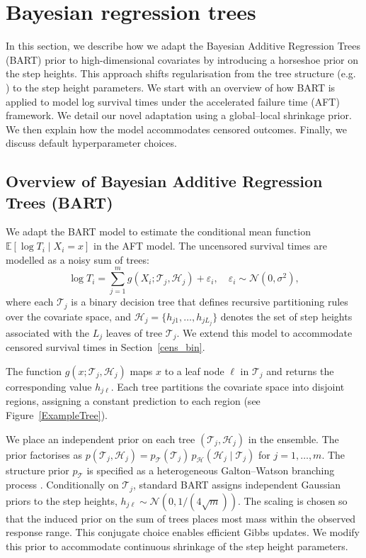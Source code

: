 \section{Bayesian regression trees}\label{section:Model}

In this section, we describe how we adapt the Bayesian Additive Regression Trees (BART) prior \citep{BARToriginal} to high-dimensional covariates by introducing a horseshoe prior on the step heights.
This approach shifts regularisation from the tree structure (e.g. \citet{linero2018dirichlet}) to the step height parameters.
We start with an overview of how BART is applied to model log survival times under the accelerated failure time (AFT) framework.
We detail our novel adaptation using a global--local shrinkage prior.
We then explain how the model accommodates censored outcomes.
Finally, we discuss default hyperparameter choices.


\subsection{Overview of Bayesian Additive Regression Trees (BART)}

We adapt the BART model to estimate the conditional mean function $\mathbb{E}[\log{T_i}\mid X_i = x]$ in the AFT model.
The uncensored survival times are modelled as a noisy sum of trees:
\begin{equation}\label{bart_model}
\log{T_i} = \sum_{j=1}^m g(X_i; \mathcal{T}_j, \mathcal{H}_j) + \varepsilon_i, \quad \varepsilon_i \sim \mathcal{N}(0, \sigma^2),
\end{equation}
where each $\mathcal{T}_j$ is a binary decision tree that defines recursive partitioning rules over the covariate space, and $\mathcal{H}_j = \{h_{j1}, \ldots, h_{jL_j}\}$ denotes the set of step heights associated with the $L_j$ leaves of tree $\mathcal{T}_j$.
We extend this model to accommodate censored survival times in Section~\ref{cens_bin}.

The function $g(x; \mathcal{T}_j, \mathcal{H}_j)$ maps $x$ to a leaf node $\ell$ in $\mathcal{T}_j$ and returns the corresponding value $h_{j\ell}$. 
Each tree partitions the covariate space into disjoint regions, assigning a constant prediction to each region (see Figure~\ref{ExampleTree}).




We place an independent prior on each tree $(\mathcal{T}_j,\mathcal{H}_j)$ in the ensemble.
The prior factorises as $p(\mathcal{T}_j,\mathcal{H}_j)=p_{\mathcal{T}}(\mathcal{T}_j)\,p_{\mathcal{H}}(\mathcal{H}_j\mid \mathcal{T}_j)$ for $j=1,\ldots,m$.
The structure prior $p_{\mathcal{T}}$ is specified as a heterogeneous Galton--Watson branching process \citep{TheoryBART}. 
Conditionally on $\mathcal{T}_j$, standard BART assigns independent Gaussian priors to the step heights, $h_{j\ell}\sim \mathcal{N}\!\left(0,1/(4\sqrt{m})\right)$. 
The scaling is chosen so that the induced prior on the sum of trees places most mass within the observed response range.
This conjugate choice enables efficient Gibbs updates. 
We modify this prior to accommodate continuous shrinkage of the step height parameters.


